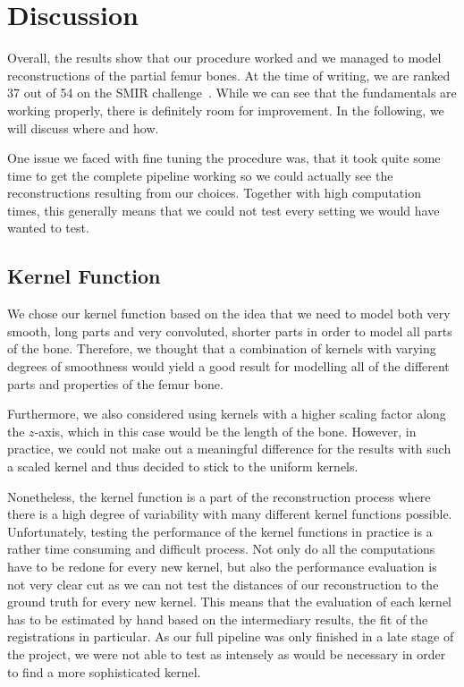 \section{Discussion}
\label{sec:discussion}
Overall, the results show that our procedure worked and we managed to model reconstructions of the partial femur bones. 
At the time of writing, we are ranked 37 out of 54 on the SMIR challenge~\cite{smir}. 
While we can see that the fundamentals are working properly, there is definitely room for improvement. 
In the following, we will discuss where and how.

One issue we faced with fine tuning the procedure was, that it took quite some time to get the complete pipeline working so we could actually see the reconstructions resulting from our choices. 
Together with high computation times, this generally means that we could not test every setting we would have wanted to test.
		

\subsection{Kernel Function}
\label{subsec:kernfuncdisc}
We chose our kernel function based on the idea that we need to model both very smooth, long parts and very convoluted, shorter parts in order to model all parts of the bone. 
Therefore, we thought that a combination of kernels with varying degrees of smoothness would yield a good result for modelling all of the different parts and properties of the femur bone. 

Furthermore, we also considered using kernels with a higher scaling factor along the $z$-axis, which in this case would be the length of the bone. 
However, in practice, we could not make out a meaningful difference for the results with such a scaled kernel and thus decided to stick to the uniform kernels.

Nonetheless, the kernel function is a part of the reconstruction process where there is a high degree of variability with many different kernel functions possible. 
Unfortunately, testing the performance of the kernel functions in practice is a rather time consuming and difficult process.
Not only do all the computations have to be redone for every new kernel, but also the performance evaluation is not very clear cut as we can not test the distances of our reconstruction to the ground truth for every new kernel.
This means that the evaluation of each kernel has to be estimated by hand based on the intermediary results, the fit of the registrations in particular. 
As our full pipeline was only finished in a late stage of the project, we were not able to test as intensely as would be necessary in order to find a more sophisticated kernel.

